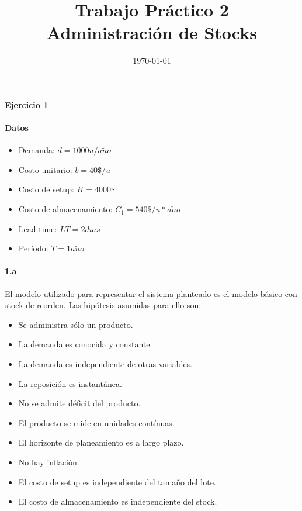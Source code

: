 \documentclass[a4paper,10pt]{article}
\title{Trabajo Práctico 2\\Administración de Stocks}
\author{}
\date{\today}
\def \anio {a\tilde{n}o}
\begin{document}
\maketitle

\paragraph{Ejercicio 1}
  \paragraph{Datos}
    \begin{itemize}
      \item Demanda: $d = 1000u/\anio$
      \item Costo unitario: $b = 40\$/u$
      \item Costo de setup: $K = 4000\$$ 
      \item Costo de almacenamiento: $C_1 = 540\$/u * \anio$
      \item Lead time: $LT = 2dias$
      \item Período: $T = 1\anio$
    \end{itemize}

  \paragraph{1.a}
    El modelo utilizado para representar el sistema planteado es el modelo básico con stock de reorden. Las hipótesis asumidas para ello son:
    \begin{itemize}
      \item Se administra sólo un producto.
      \item La demanda es conocida y constante.
      \item La demanda es independiente de otras variables.
      \item La reposición es instantánea.
      \item No se admite déficit del producto.
      \item El producto se mide en unidades contínuas.
      \item El horizonte de planeamiento es a largo plazo.
      \item No hay inflación.
      \item El costo de setup es independiente del tamaño del lote.
      \item El costo de almacenamiento es independiente del stock.
    \end{itemize}
\end{document}
